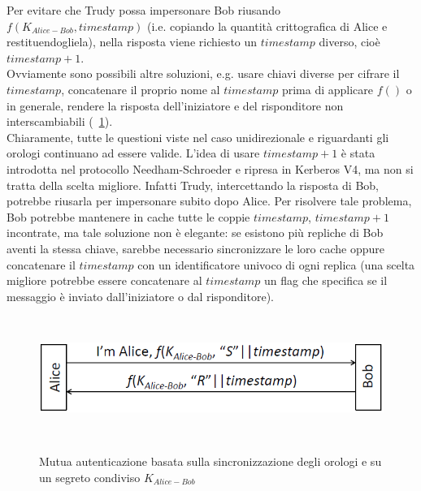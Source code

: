 Per evitare che Trudy possa impersonare Bob riusando $f(K_{Alice-Bob}, timestamp)$ (i.e. copiando la quantità crittografica di Alice e restituendogliela), nella risposta viene richiesto un $timestamp$ diverso, cioè $timestamp + 1$.\\
Ovviamente sono possibili altre soluzioni, e.g. usare chiavi diverse per cifrare il $timestamp$, concatenare il proprio nome al $timestamp$ prima di applicare $f()$ o in generale, rendere la risposta dell'iniziatore e del
risponditore non interscambiabili (\figurename~\ref{fig:ImgS56bis}).\\
Chiaramente, tutte le questioni viste nel caso unidirezionale e riguardanti gli orologi continuano ad essere valide. L'idea di usare $timestamp + 1$ è stata introdotta nel protocollo Needham-Schroeder e ripresa in Kerberos V4, ma non si tratta della scelta migliore. Infatti Trudy, intercettando la risposta di Bob, potrebbe riusarla per impersonare subito dopo Alice. Per risolvere tale problema, Bob potrebbe mantenere in cache tutte le coppie $timestamp$, $timestamp + 1$ incontrate, ma tale soluzione non è elegante: se esistono più repliche di Bob aventi la stessa chiave, sarebbe necessario sincronizzare le loro cache oppure concatenare il $timestamp$ con un identificatore univoco di ogni replica (una scelta migliore potrebbe essere concatenare al $timestamp$ un flag che specifica se il messaggio è inviato dall'iniziatore o dal risponditore).
\begin{figure}[htbp]
	\centering%
	\subfigure%
	{\includegraphics[height=4cm, width=12cm, keepaspectratio]{Immagini/autenticazione/ImgS56bis.png}}
	\caption{Mutua autenticazione basata sulla sincronizzazione degli orologi e su un segreto condiviso $K_{Alice-Bob}$}\label{fig:ImgS56bis} 	
\end{figure}

